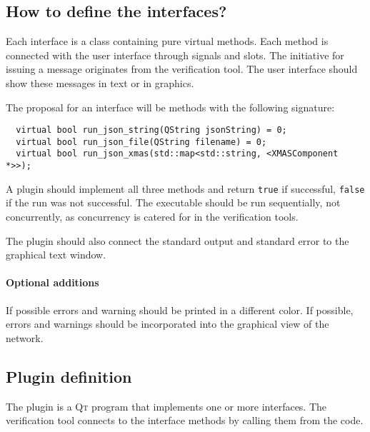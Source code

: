 \documentclass[a4paper,11pt,final]{article}
\newcommand{\qt}{\textsc{Qt}\xspace}%
\newcommand{\code}[1]{\texttt{#1}\xspace}%
\begin{document}
\subsection{How to define the interfaces?}

Each interface is a class containing pure virtual methods. Each method is connected with
the user interface through signals and slots. The initiative for issuing a message originates
from the verification tool. The user interface should show these messages in text or in graphics.

The proposal for an interface will be methods with the following signature:

\begin{verbatim}
  virtual bool run_json_string(QString jsonString) = 0;
  virtual bool run_json_file(QString filename) = 0;
  virtual bool run_json_xmas(std::map<std::string, <XMASComponent *>>);
\end{verbatim}

A plugin should implement all three methods and return \code{true} if
successful, \code{false} if the run was not successful. The executable
should be run sequentially, not concurrently, as concurrency is catered for 
in the verification tools.

The plugin should also connect the standard output and standard error to
the graphical text window. 

\paragraph{Optional additions} If possible errors and warning should be printed
in a different color. If possible, errors and warnings should be incorporated into
the graphical view of the network.

\subsection{Plugin definition}

The plugin is a \qt program that implements one or more interfaces. The
verification tool connects to the interface methods by calling them from the
code. 
\end{document}
